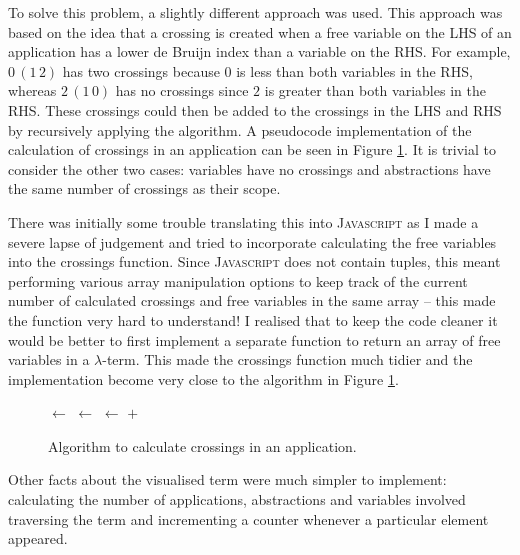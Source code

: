 \documentclass[11pt]{article}
\begin{document}
To solve this problem, a slightly different approach was used. This approach was based on the idea that a crossing is created when a free variable on the LHS of an application has a lower de Bruijn index than a variable on the RHS. For example, $0 \, (1 \, 2)$ has two crossings because $0$ is less than both variables in the RHS, whereas $2 \, (1 \, 0)$ has no crossings since $2$ is greater than both variables in the RHS. These crossings could then be added to the crossings in the LHS and RHS by recursively applying the algorithm. A pseudocode implementation of the calculation of crossings in an application can be seen in Figure \ref{fig:crossings}. It is trivial to consider the other two cases: variables have no crossings and abstractions have the same number of crossings as their scope.

There was initially some trouble translating this into \textsc{Javascript} as I made a severe lapse of judgement and tried to incorporate calculating the free variables into the crossings function. Since \textsc{Javascript} does not contain tuples, this meant performing various array manipulation options to keep track of the current number of calculated crossings and free variables in the same array -- this made the function very hard to understand! I realised that to keep the code cleaner it would be better to first implement a separate function to return an array of free variables in a $\lambda$-term. This made the crossings function much tidier and the implementation become very close to the algorithm in Figure \ref{fig:crossings}.

\begin{figure}
\begin{algorithm}[H]
\LHS $\leftarrow$  \;
\RHS $\leftarrow$  \;
\TotalCrossings $\leftarrow$  $+$  \;
\Return \TotalCrossings \;
\end{algorithm}
\caption{Algorithm to calculate crossings in an application.}
\label{fig:crossings}
\end{figure}

Other facts about the visualised term were much simpler to implement: calculating the number of applications, abstractions and variables involved traversing the term and incrementing a counter whenever a particular element appeared.
\end{document}
